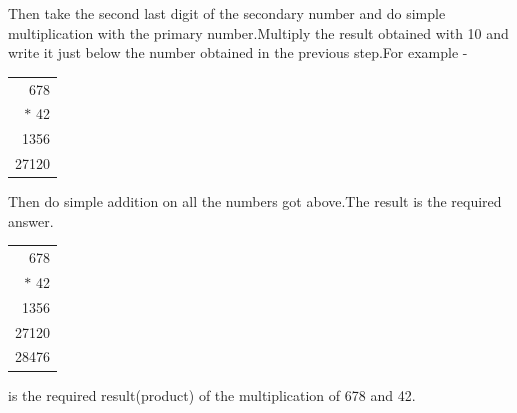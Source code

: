 \documentclass[12pt]{article}
\begin{document}
\newline
\newline
Then take the second last digit of the secondary number and do simple multiplication with the primary number.Multiply the result obtained with 10 and write it just below the number obtained in the previous step.For example -
\newline
\begin{tabular}{r}
678\\
$*$ 42\\
\hline
1356\\
27120\\
\hline
\end{tabular}
\newline
\newline
Then do simple addition on all the numbers got above.The result is the required answer.
\newline
\newline
\begin{tabular}{r}
678\\
$*$ 42\\
\hline
1356\\
27120\\
\hline
28476\\
\hline
\end{tabular}
\newline
{} is the required result(product) of the multiplication of 678 and 42.
\end{document}
